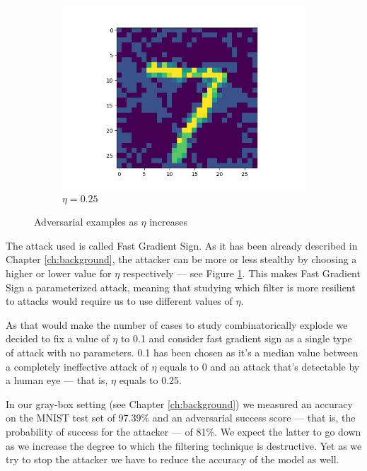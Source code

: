 \begin{figure}
\begin{subfigure}{0.3\linewidth}
    \includegraphics[width=\linewidth]{Images/adversarial-input-fc-100-100-10-025.png}
    \caption{$\eta = 0.25$}
  \end{subfigure}
  \caption{Adversarial examples as $\eta$ increases}
  \label{fig:fgs-increasing-eta}
\end{figure}

The attack used is called Fast Gradient Sign. As it has been already
described in Chapter \ref{ch:background}, the attacker can be more or
less stealthy by choosing a higher or lower value for $\eta$
respectively --- see Figure \ref{fig:fgs-increasing-eta}. This makes
Fast Gradient Sign a parameterized attack, meaning that studying which
filter is more resilient to attacks would require us to use different
values of $\eta$.

As that would make the number of cases to study
combinatorically explode we decided to fix a value of $\eta$ to 0.1 and
consider fast gradient sign as a single type of attack with no
parameters. 0.1 has been chosen as it's a median value
between a completely ineffective attack of $\eta$ equals to 0 and an
attack that's detectable by a human eye --- that is, $\eta$ equals
to 0.25.

In our gray-box setting (see Chapter \ref{ch:background}) we measured
an accuracy on the MNIST test set of 97.39\% and an adversarial success
score --- that is, the probability of success for the attacker --- of
81\%. We expect the latter to go down as we increase the degree
to which the filtering technique is destructive. Yet as we try to stop the
attacker we have to reduce the accuracy of the model as well.

